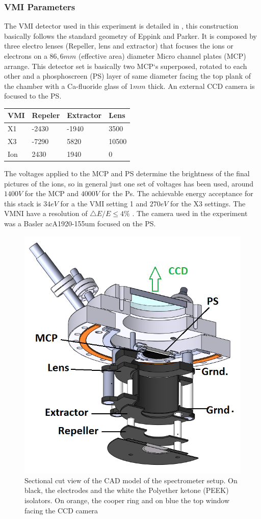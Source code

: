\subsubsection{VMI Parameters}

The VMI detector used in this experiment is detailed in \cite{schomas_compact_2017}, this construction basically follows the standard geometry of Eppink and Parker\cite{eppink_velocity_1997}. It is composed by three electro lenses (Repeller, lens and extractor) that focuses the ions or electrons on a $86,6mm$ (effective area) diameter Micro channel plates (MCP) arrange. This detector set is basically  two MCP`s superposed,  rotated to each other and a phosphoscreen (PS) layer of same diameter facing the top plank of the chamber with a Ca-fluoride glass of $1mm$ thick. An external CCD camera is focused to the PS. 

\begin{table}[]
\centering
\begin{tabular}{|l|l|l|l|}
\hline
\rowcolor[HTML]{EFEFEF} 
VMI & Repeler & Extractor & Lens  \\ \hline
X1  & -2430   & -1940     & 3500  \\ \hline
X3  & -7290   & 5820      & 10500 \\ \hline
Ion & 2430    & 1940      & 0     \\ \hline
\end{tabular}
\end{table}

The voltages applied to the MCP and PS determine the brightness of the final pictures of the ions, so in general just one set of voltages has been used, around $1400V$ for the MCP and $4000V$ for the Ps. The achievable energy acceptance for this stack is $34eV$ for a the VMI setting 1 and $270 eV$ for the X3 settings. The VMNI have a resolution of $\bigtriangleup E / E\leq 4\%$ \cite{schomas_compact_2017}. The camera used in the experiment was a Basler acA1920-155um focused on the PS.

\begin{figure}[hbtp]
\label{img:mcp cut}
\centering
\includegraphics[width =8 cm]{../Images/MCP cut.png}
\caption[MCP sketch cut]{Sectional cut view of the CAD model of the spectrometer setup. On black, the electrodes and the white the Polyether ketone (PEEK) isolators. On orange, the cooper ring and on blue the top window facing the CCD camera
}
\end{figure}

